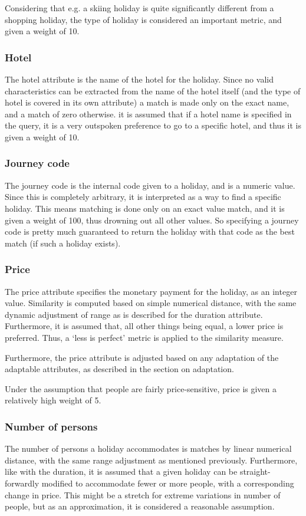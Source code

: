 \documentclass[11pt]{article}
\begin{document}
Considering that e.g. a skiing holiday is quite significantly
different from a shopping holiday, the type of holiday is considered
an important metric, and given a weight of 10.

\subsubsection{Hotel}
The hotel attribute is the name of the hotel for the holiday. Since
no valid characteristics can be extracted from the name of the hotel
itself (and the type of hotel is covered in its own attribute) a match
is made only on the exact name, and a match of zero otherwise. it is
assumed that if a hotel name is specified in the query, it is a very
outspoken preference to go to a specific hotel, and thus it is given a
weight of 10.

\subsubsection{Journey code}
The journey code is the internal code given to a holiday, and is a
numeric value. Since this is completely arbitrary, it is interpreted
as a way to find a specific holiday. This means matching is done only
on an exact value match, and it is given a weight of 100, thus
drowning out all other values. So specifying a journey code is pretty
much guaranteed to return the holiday with that code as the best match
(if such a holiday exists).

\subsubsection{Price}
The price attribute specifies the monetary payment for the holiday, as
an integer value. Similarity is computed based on simple numerical
distance, with the same dynamic adjustment of range as is described
for the duration attribute. Furthermore, it is assumed that, all
other things being equal, a lower price is preferred. Thus, a `less is
perfect' metric is applied to the similarity measure.

Furthermore, the price attribute is adjusted based on any adaptation
of the adaptable attributes, as described in the section on
adaptation.

Under the assumption that people are fairly price-sensitive, price is
given a relatively high weight of 5.

\subsubsection{Number of persons}
The number of persons a holiday accommodates is matches by linear
numerical distance, with the same range adjustment as mentioned
previously. Furthermore, like with the duration, it is assumed that a
given holiday can be straight-forwardly modified to accommodate fewer
or more people, with a corresponding change in price. This might be a
stretch for extreme variations in number of people, but as an
approximation, it is considered a reasonable assumption.
\end{document}
